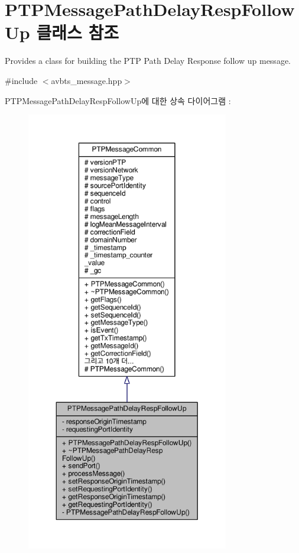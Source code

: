 \hypertarget{class_p_t_p_message_path_delay_resp_follow_up}{}\section{P\+T\+P\+Message\+Path\+Delay\+Resp\+Follow\+Up 클래스 참조}
\label{class_p_t_p_message_path_delay_resp_follow_up}


Provides a class for building the P\+TP Path Delay Response follow up message.  




{\ttfamily \#include $<$avbts\+\_\+message.\+hpp$>$}



P\+T\+P\+Message\+Path\+Delay\+Resp\+Follow\+Up에 대한 상속 다이어그램 \+: 
\nopagebreak
\begin{figure}[H]
\begin{center}
\leavevmode
\includegraphics[height=550pt]{class_p_t_p_message_path_delay_resp_follow_up__inherit__graph}
\end{center}
\end{figure}


